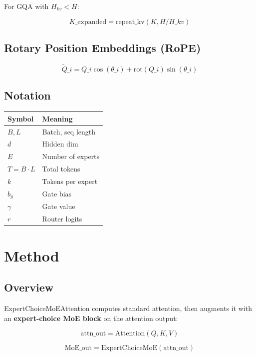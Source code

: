 For GQA with $H_{kv} < H$:

\[
K\_\text{expanded} = \text{repeat\_kv}(K, H / H\_{kv})
\tag{3.10}
\]

\subsection{Rotary Position Embeddings (RoPE)}

\[
\tilde{Q}\_i = Q\_i \cos(\theta\_i) + \text{rot}(Q\_i) \sin(\theta\_i)
\tag{3.11}
\]

\subsection{Notation}

\begin{table}[H]
\centering
\small
\begin{tabular}{ll}
\toprule
\textbf{Symbol} & \textbf{Meaning} \\
\midrule
$B, L$ & Batch, seq length \\
$d$ & Hidden dim \\
$E$ & Number of experts \\
$T = B \cdot L$ & Total tokens \\
$k$ & Tokens per expert \\
$b_g$ & Gate bias \\
$\gamma$ & Gate value \\
$r$ & Router logits \\
\bottomrule
\end{tabular}
\end{table}



\section{Method}

\subsection{Overview}

ExpertChoiceMoEAttention computes standard attention, then augments it with 
an \textbf{expert-choice MoE block} on the attention output:

\[
\text{attn\_out} = \text{Attention}(Q, K, V)
\tag{4.1}
\]

\[
\text{MoE\_out} = \text{ExpertChoiceMoE}(\text{attn\_out})
\tag{4.2}
\]

